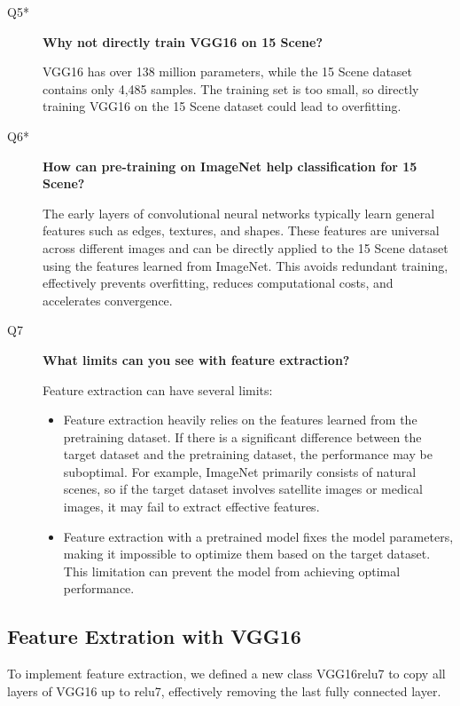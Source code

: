 \documentclass{rapportECL}
\begin{document}
\begin{description}
    \item[Q5*] \textbf{Why not directly train VGG16 on 15 Scene?}
    
    VGG16 has over 138 million parameters, while the 15 Scene dataset contains only 4,485 samples. The training set is too small, so directly training VGG16 on the 15 Scene dataset could lead to overfitting.

    \item[Q6*]  \textbf{How can pre-training on ImageNet help classification for 15 Scene?}
    
    The early layers of convolutional neural networks typically learn general features such as edges, textures, and shapes. These features are universal across different images and can be directly applied to the 15 Scene dataset using the features learned from ImageNet. This avoids redundant training, effectively prevents overfitting, reduces computational costs, and accelerates convergence.

    \item[Q7] \textbf{What limits can you see with feature extraction? }

    Feature extraction can have several limits:
    \begin{itemize}
        \item Feature extraction heavily relies on the features learned from the pretraining dataset. If there is a significant difference between the target dataset and the pretraining dataset, the performance may be suboptimal. For example, ImageNet primarily consists of natural scenes, so if the target dataset involves satellite images or medical images, it may fail to extract effective features.
        \item Feature extraction with a pretrained model fixes the model parameters, making it impossible to optimize them based on the target dataset. This limitation can prevent the model from achieving optimal performance.
    \end{itemize}
    
\end{description}

\subsection{Feature Extration with VGG16}

To implement feature extraction, we defined a new class VGG16relu7 to copy all layers of VGG16 up to relu7, effectively removing the last fully connected layer.
\end{document}
